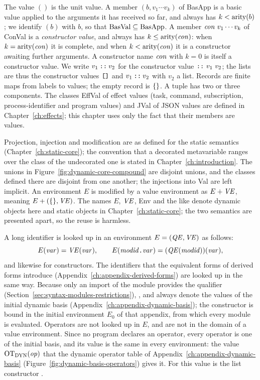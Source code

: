 The value $()$ is the unit value. A member $(b, v_1\cdots v_k)$ of BasApp is
a basic value applied to the arguments it has received so far, and always has
$k<\mathrm{arity}(b)$; we identify $(b)$ with $b$, so that $\mathrm{BasVal}\subseteq\mathrm{BasApp}$.
A member $\mathit{con}\ v_1\cdots v_k$ of ConVal is a \emph{constructor value}, and
always has $k\leq\mathrm{arity}(\mathit{con})$: when $k=\mathrm{arity}(\mathit{con})$ it is complete, and
when $k<\mathrm{arity}(\mathit{con})$ it is a constructor awaiting further arguments. A
constructor name $\mathit{con}$ with $k=0$ is itself a constructor value. We write
$v_1\mathbin{\textnormal{\texttt{::}}}v_2$ for the constructor value $\textnormal{\texttt{::}}\ v_1\ v_2$; the
lists are thus the constructor values $\textnormal{\texttt{[]}}$ and $v_1\mathbin{\textnormal{\texttt{::}}}v_2$
with $v_2$ a list. Records are finite maps from labels to values; the
empty record is $\{\}$. A tuple has two or three components.
The classes EffVal of effect values (task, command, subscription,
process-identifier and program values) and JVal of JSON values are defined
in Chapter~\ref{ch:effects}; this chapter uses only the fact that their
members are values. %

Projection, injection and modification are as defined for the static
semantics (Chapter~\ref{ch:static-core}); the convention that a decorated
metavariable ranges over the class of the undecorated one is stated in
Chapter~\ref{ch:introduction}. %
The
unions in Figure~\ref{fig:dynamic-core-compound} are disjoint unions, and the
classes defined there are disjoint from one another; the injections into Val
are left implicit. An environment $E$ is modified by a
value environment as $E+\mathit{VE}$, meaning $E+(\{\},\mathit{VE})$.
The names $E$, $\mathit{VE}$, Env and the like denote dynamic objects here and
static objects in Chapter~\ref{ch:static-core}; the two semantics are
presented apart, so the reuse is harmless.

A long identifier is looked up in an environment $E=(\mathit{QE},\mathit{VE})$ as follows:
\[
  E(\mathit{var})=\mathit{VE}(\mathit{var}),\qquad
  E(\mathit{modid}\textnormal{\texttt{.}}\mathit{var})=(\mathit{QE}(\mathit{modid}))(\mathit{var}),
\]
and likewise for constructors. The identifiers that the equivalent forms of
derived forms introduce (Appendix~\ref{ch:appendix-derived-forms}) are looked
up in the same way. Because only an import of the module  provides
the qualifier  (Section~\ref{sec:syntax-modules-restrictions}),
,  and  always denote the
values of the initial dynamic basis
(Appendix~\ref{ch:appendix-dynamic-basis}); the constructor \kw{::} is bound
in the initial environment $E_0$ of that appendix, from which every module is
evaluated. %
Operators are not looked up in $E$, and are
not in the domain of a value environment. Since no program declares an
operator, every operator is one of the initial basis, and its value is the
same in every environment: the value $\mathrm{OT}_{\mathrm{DYN}}(\mathit{op})$ that the dynamic
operator table of Appendix~\ref{ch:appendix-dynamic-basis}
(Figure~\ref{fig:dynamic-basis-operators}) gives it. For \kw{::} this value
is the list constructor \kw{::}. %

